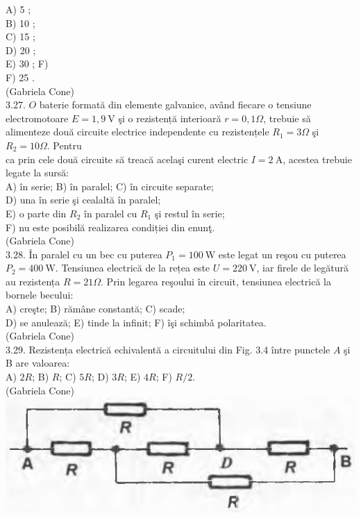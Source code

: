 \documentclass[10pt]{article}
\begin{document}
A) 5 ;\\
B) 10 ;\\
C) 15 ;\\
D) 20 ;\\
E) 30 ; F)\\
F) 25 .\\
(Gabriela Cone)\\
3.27. $O$ baterie formată din elemente galvanice, având fiecare o tensiune electromotoare $E=1,9 \mathrm{~V}$ şi o rezistență interioară $r=0,1 \Omega$, trebuie să alimenteze două circuite electrice independente cu rezistențele $R_{1}=3 \Omega$ şi $R_{2}=10 \Omega$. Pentru\\
ca prin cele două circuite să treacă acelaşi curent electric $I=2 \mathrm{~A}$, acestea trebuie legate la sursă:\\
A) în serie; B) în paralel; C) în circuite separate;\\
D) una în serie şi cealaltă în paralel;\\
E) o parte din $R_{2}$ în paralel cu $R_{1}$ şi restul în serie;\\
F) nu este posibilă realizarea condiției din enunţ.\\
(Gabriela Cone)\\
3.28. În paralel cu un bec cu puterea $P_{1}=100 \mathrm{~W}$ este legat un reşou cu puterea $P_{2}=400 \mathrm{~W}$. Tensiunea electrică de la rețea este $U=220 \mathrm{~V}$, iar firele de legătură au rezistența $R=21 \Omega$. Prin legarea reşoului în circuit, tensiunea electrică la bornele becului:\\
A) creşte; B) rămâne constantă; C) scade;\\
D) se anulează; E) tinde la infinit; F) îşi schimbǎ polaritatea.\\
(Gabriela Cone)\\
3.29. Rezistența electrică echivalentă a circuitului din Fig. 3.4 între punctele $A$ şi B are valoarea:\\
A) $2 R$; B) $R$; C) $5 R$; D) $3 R$; E) $4 R$; F) $R / 2$.\\
(Gabriela Cone)\\
\includegraphics[max width=\textwidth, center]{2025_07_01_5b3ff9fa0d508c8e9f17g-149}
\end{document}
